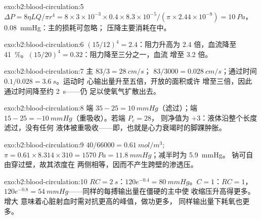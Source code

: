 \begin{solution}{exo:b2:blood-circulation:5}
$\Delta P = 8\eta LQ/\pi r^{4} = 8\times 3\times 10^{-3}\times
0.4\times 8.3\times 10^{-5}/(\pi\times 2.44\times 10^{-8}) =
\qty{10}{Pa}$，\qty{0.08}{mmHg}：主的损耗可忽略；
压降主要消耗在中。
\end{solution}

\begin{solution}{exo:b2:blood-circulation:6}
$(15/12)^{4} = 2.4$：阻力升高为 2.4 倍，血流降至
\qty{41}{\%}。$(15/20)^{4} = 0.32$：阻力降至三分之一，血流
增至 3.2 倍。
\end{solution}

\begin{solution}{exo:b2:blood-circulation:7}
主 $83/3 = \qty{28}{cm/s}$； $83/3000 =
\qty{0.028}{cm/s}$；通过时间 $0.1/0.028 = \qty{3.6}{s}$。运动时
心输出量升至五倍，开放的面积或许
增至三倍，因此通过时间降至约 \qty{2}{s}——仍
足以使氧气扩散出去。
\end{solution}

\begin{solution}{exo:b2:blood-circulation:8}
端 $35 - 25 = \qty{+10}{mmHg}$（滤过）；端 $15
- 25 = \qty{-10}{mmHg}$（重吸收）。若端 $P_c = 28$，
则净值为 $+3$：液体沿整个长度滤过，没有任何
液体被重吸收——即，也就是心力衰竭时的脚踝肿胀。
\end{solution}

\begin{solution}{exo:b2:blood-circulation:9}
$40/66000 = \qty{0.61}{mol/m^3}$; $\pi = 0.61\times 8.314\times 310 =
\qty{1570}{Pa} = \qty{11.8}{mmHg}$；减半时为 \qty{5.9}{mmHg}。
钠可自由穿过壁，故其浓度在
两侧相等，因而不产生跨壁的渗透压。
\end{solution}

\begin{solution}{exo:b2:blood-circulation:10}
$RC = \qty{2}{s}$：$120e^{-0.4} = \qty{80}{mmHg}$。$C = 1$：$RC = 1$，
$120e^{-0.8} = \qty{54}{mmHg}$——同样的每搏输出量在僵硬的主中使
收缩压升高得更多。增大
意味着心脏射血时需对抗更高的峰值，做功更多，
同样输出量下耗氧也更多。
\end{solution}

